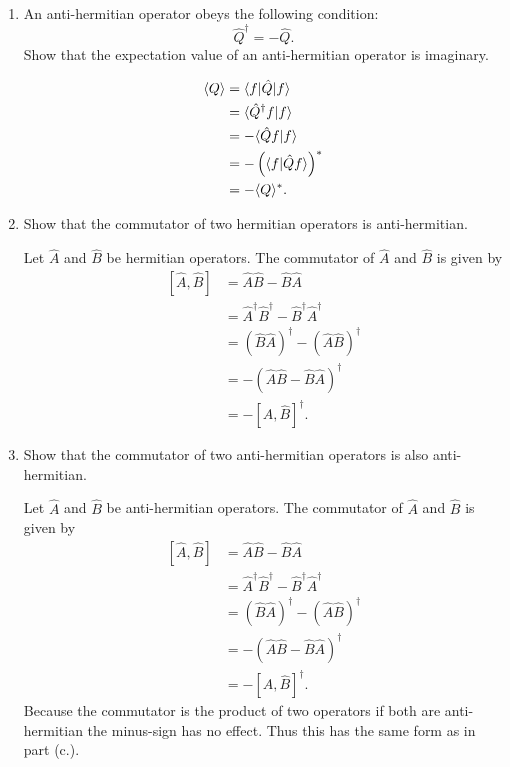 \documentclass[a4paper, 12pt]{config/homework}
\begin{document}
\begin{enumerate}
\begin{enumerate}[label=(\alph*.)]
\item An anti-hermitian operator obeys the following condition:
\[\hat{Q}^\dagger = -\hat{Q}.\]
Show that the expectation value of an anti-hermitian operator is imaginary.

\begin{align*}
\langle Q \rangle &= \bra*{f}\hat{Q}\ket*{f}
\\&= \langle \hat{Q}^\dagger f | f \rangle
\\&= - \langle \hat{Q} f | f \rangle
\\&= - \left( \langle f | \hat{Q} f \rangle \right)^*
\\&= - \langle Q \rangle^*.
\end{align*}

\item Show that the commutator of two hermitian operators is anti-hermitian.

Let \(\hat{A}\) and \(\hat{B}\) be hermitian operators.
The commutator of \(\hat{A}\) and \(\hat{B}\) is given by
\begin{align*}
\left[\hat{A}, \hat{B}\right] &= \hat{A}\hat{B} - \hat{B}\hat{A}
\\&= \hat{A}^\dagger \hat{B}^\dagger - \hat{B}^\dagger \hat{A}^\dagger
\\&= \left(\hat{B}\hat{A}\right)^\dagger - \left(\hat{A}\hat{B}\right)^\dagger
\\&= -\left(\hat{A}\hat{B} - \hat{B}\hat{A}\right)^\dagger
\\&= -\left[\hat{A}, \hat{B}\right]^\dagger.
\end{align*}

\item Show that the commutator of two anti-hermitian operators is also anti-hermitian.

Let \(\hat{A}\) and \(\hat{B}\) be anti-hermitian operators.
The commutator of \(\hat{A}\) and \(\hat{B}\) is given by
\begin{align*}
\left[\hat{A}, \hat{B}\right] &= \hat{A}\hat{B} - \hat{B}\hat{A}
\\&= \hat{A}^\dagger \hat{B}^\dagger - \hat{B}^\dagger \hat{A}^\dagger
\\&= \left(\hat{B}\hat{A}\right)^\dagger - \left(\hat{A}\hat{B}\right)^\dagger
\\&= -\left(\hat{A}\hat{B} - \hat{B}\hat{A}\right)^\dagger
\\&= -\left[\hat{A}, \hat{B}\right]^\dagger.
\end{align*}
Because the commutator is the product of two operators if both are anti-hermitian the minus-sign has no effect. Thus this has the same form as in part (c.).


\end{enumerate}
\end{enumerate}
\end{document}
